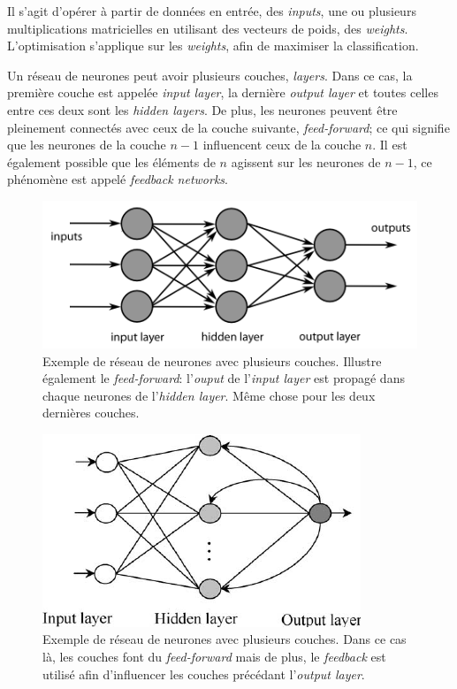 \documentclass[a4paper, 11pt]{article}
\begin{document}
Il s'agit d'opérer à partir de données en entrée, des \textit{inputs}, une ou plusieurs multiplications matricielles en utilisant des vecteurs de poids, des \textit{weights}. L'optimisation s'applique sur les \textit{weights}, afin de maximiser la classification.

Un réseau de neurones peut avoir plusieurs couches, \textit{layers}. Dans ce cas, la première couche est appelée \textit{input layer}, la dernière \textit{output layer} et toutes celles entre ces deux sont les \textit{hidden layers}. De plus, les neurones peuvent être pleinement connectés avec ceux de la couche suivante, \textit{feed-forward}; ce qui signifie que les neurones de la couche $n-1$ influencent ceux de la couche $n$. Il est également possible que les éléments de $n$ agissent sur les neurones de $n-1$, ce phénomène est appelé \textit{feedback networks}.

\begin{figure}[H]
\centering
\includegraphics[scale=0.4]{images/neural_net_feedforward}
\caption[]{Exemple de réseau de neurones avec plusieurs couches. Illustre également le \textit{feed-forward}: l'\textit{ouput} de l'\textit{input layer} est propagé dans chaque neurones de l'\textit{hidden layer}. Même chose pour les deux dernières couches.\footnotemark}
\end{figure}


\begin{figure}[H]
\centering
\includegraphics{images/neural_net_feedback}
\caption[]{Exemple de réseau de neurones avec plusieurs couches. Dans ce cas là, les couches font du \textit{feed-forward} mais de plus, le \textit{feedback} est utilisé afin d'influencer les couches précédant l'\textit{output layer}.\footnotemark}
\end{figure}
\end{document}
